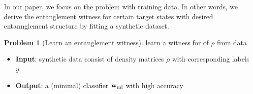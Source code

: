 \documentclass[
aps,
pra,
twocolumn,
floatfix,
]{revtex4-2}
\theoremstyle{plain}
\theoremstyle{definition}
\newtheorem{problem}{Problem}
\newcommand{\dm}{\rho}
\newcommand{\ml}{\text{ml}}
\begin{document}
In our paper, we focus on the problem  with training data.
In other words, we derive the entanglement witness for certain target states with desired entannglement structure by fitting a synthetic dataset.
\begin{problem}[Learn an entanglement witness]\label{prm:learn_witness}
	learn a witness for  of $\dm$ from data
	\begin{itemize}
		\item \textbf{Input}:  synthetic data consist of density matrices $\dm$ with corresponding labels $y$
		\item \textbf{Output}: a (minimal) classifier $\vbw_{\ml}$ with high accuracy
	\end{itemize}
\end{problem}


\end{document}

